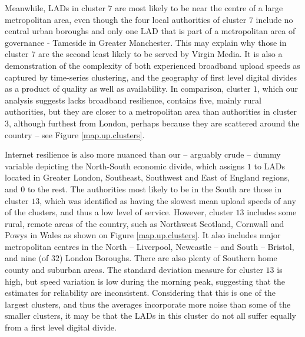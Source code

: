 \documentclass[]{interact}
\theoremstyle{plain}%
\theoremstyle{definition}
\theoremstyle{remark}
\begin{document}
Meanwhile, LADs in cluster \(7\) are most likely to be near the centre
of a large metropolitan area, even though the four local authorities of
cluster \(7\) include no central urban boroughs and only one LAD that is
part of a metropolitan area of governance - Tameside in Greater
Manchester. This may explain why those in cluster \(7\) are the second
least likely to be served by Virgin Media. It is also a demonstration of
the complexity of both experienced broadband upload speeds as captured
by time-series clustering, and the geography of first level digital
divides as a product of quality as well as availability. In comparison,
cluster \(1\), which our analysis suggests lacks broadband resilience,
contains five, mainly rural authorities, but they are closer to a
metropolitan area than authorities in cluster \(3\), although furthest
from London, perhaps because they are scattered around the country --
see Figure \ref{map.up.clusters}.

Internet resilience is also more nuanced than our -- arguably crude --
dummy variable depicting the North-South economic divide, which assigns
\(1\) to LADs located in Greater London, Southeast, Southwest and East
of England regions, and \(0\) to the rest. The authorities most likely
to be in the South are those in cluster \(13\), which was identified as
having the slowest mean upload speeds of any of the clusters, and thus a
low level of service. However, cluster \(13\) includes some rural,
remote areas of the country, such as Northwest Scotland, Cornwall and
Powys in Wales as shown on Figure \ref{map.up.clusters}. It also
includes major metropolitan centres in the North -- Liverpool, Newcastle
-- and South -- Bristol, and nine (of \(32\)) London Boroughs. There are
also plenty of Southern home county and suburban areas. The standard
deviation measure for cluster \(13\) is high, but speed variation is low
during the morning peak, suggesting that the estimates for reliability
are inconsistent. Considering that this is one of the largest clusters,
and thus the averages incorporate more noise than some of the smaller
clusters, it may be that the LADs in this cluster do not all suffer
equally from a first level digital divide.
\end{document}
